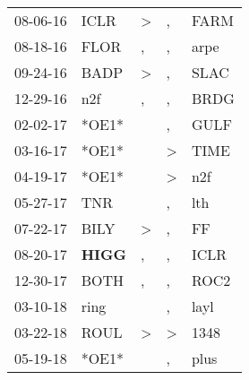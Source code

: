 \begin{supertabular}{p{0.07\textwidth}p{0.06\textwidth}p{0.02\textwidth}p{0.02\textwidth}p{0.06\textwidth}}
          08-06-16\textsuperscript{} &           ICLR\textsuperscript{} &     \textgreater &                , &           FARM\textsuperscript{} \\
          08-18-16\textsuperscript{} &           FLOR\textsuperscript{} &                , &                , &           arpe\textsuperscript{} \\
          09-24-16\textsuperscript{} &           BADP\textsuperscript{} &     \textgreater &                , &           SLAC\textsuperscript{} \\
          12-29-16\textsuperscript{} &            n2f\textsuperscript{} &                , &                , &           BRDG\textsuperscript{} \\
          02-02-17\textsuperscript{} &                            *OE1* &                  &                , &           GULF\textsuperscript{} \\
          03-16-17\textsuperscript{} &                            *OE1* &                  &     \textgreater &           TIME\textsuperscript{} \\
          04-19-17\textsuperscript{} &                            *OE1* &                  &     \textgreater &            n2f\textsuperscript{} \\
          05-27-17\textsuperscript{} &            TNR\textsuperscript{} &                  &                , &            lth\textsuperscript{} \\
          07-22-17\textsuperscript{} &           BILY\textsuperscript{} &     \textgreater &                , &             FF\textsuperscript{} \\
          08-20-17\textsuperscript{} &  \textbf{HIGG\textsuperscript{}} &                , &                , &           ICLR\textsuperscript{} \\
          12-30-17\textsuperscript{} &           BOTH\textsuperscript{} &                , &                , &           ROC2\textsuperscript{} \\
          03-10-18\textsuperscript{} &           ring\textsuperscript{} &                  &                , &           layl\textsuperscript{} \\
          03-22-18\textsuperscript{} &           ROUL\textsuperscript{} &     \textgreater &     \textgreater &           1348\textsuperscript{} \\
          05-19-18\textsuperscript{} &                            *OE1* &                  &                , &           plus\textsuperscript{} \\

\end{supertabular}
